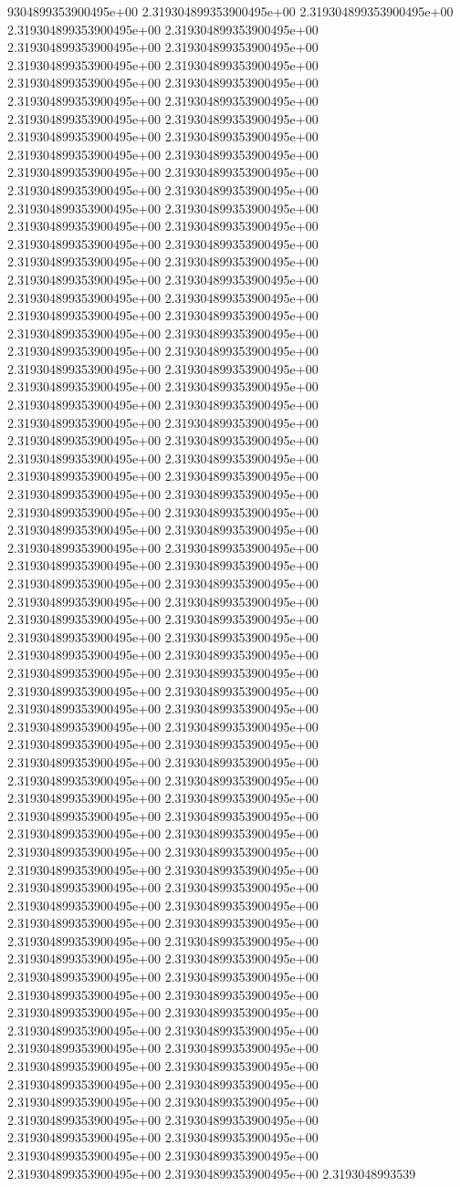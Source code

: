 9304899353900495e+00	2.319304899353900495e+00	2.319304899353900495e+00	2.319304899353900495e+00	2.319304899353900495e+00	2.319304899353900495e+00	2.319304899353900495e+00	2.319304899353900495e+00	2.319304899353900495e+00	2.319304899353900495e+00	2.319304899353900495e+00	2.319304899353900495e+00	2.319304899353900495e+00	2.319304899353900495e+00	2.319304899353900495e+00	2.319304899353900495e+00	2.319304899353900495e+00	2.319304899353900495e+00	2.319304899353900495e+00	2.319304899353900495e+00	2.319304899353900495e+00	2.319304899353900495e+00	2.319304899353900495e+00	2.319304899353900495e+00	2.319304899353900495e+00	2.319304899353900495e+00	2.319304899353900495e+00	2.319304899353900495e+00	2.319304899353900495e+00	2.319304899353900495e+00	2.319304899353900495e+00	2.319304899353900495e+00	2.319304899353900495e+00	2.319304899353900495e+00	2.319304899353900495e+00	2.319304899353900495e+00	2.319304899353900495e+00	2.319304899353900495e+00	2.319304899353900495e+00	2.319304899353900495e+00	2.319304899353900495e+00	2.319304899353900495e+00	2.319304899353900495e+00	2.319304899353900495e+00	2.319304899353900495e+00	2.319304899353900495e+00	2.319304899353900495e+00	2.319304899353900495e+00	2.319304899353900495e+00	2.319304899353900495e+00	2.319304899353900495e+00	2.319304899353900495e+00	2.319304899353900495e+00	2.319304899353900495e+00	2.319304899353900495e+00	2.319304899353900495e+00	2.319304899353900495e+00	2.319304899353900495e+00	2.319304899353900495e+00	2.319304899353900495e+00	2.319304899353900495e+00	2.319304899353900495e+00	2.319304899353900495e+00	2.319304899353900495e+00	2.319304899353900495e+00	2.319304899353900495e+00	2.319304899353900495e+00	2.319304899353900495e+00	2.319304899353900495e+00	2.319304899353900495e+00	2.319304899353900495e+00	2.319304899353900495e+00	2.319304899353900495e+00	2.319304899353900495e+00	2.319304899353900495e+00	2.319304899353900495e+00	2.319304899353900495e+00	2.319304899353900495e+00	2.319304899353900495e+00	2.319304899353900495e+00	2.319304899353900495e+00	2.319304899353900495e+00	2.319304899353900495e+00	2.319304899353900495e+00	2.319304899353900495e+00	2.319304899353900495e+00	2.319304899353900495e+00	2.319304899353900495e+00	2.319304899353900495e+00	2.319304899353900495e+00	2.319304899353900495e+00	2.319304899353900495e+00	2.319304899353900495e+00	2.319304899353900495e+00	2.319304899353900495e+00	2.319304899353900495e+00	2.319304899353900495e+00	2.319304899353900495e+00	2.319304899353900495e+00	2.319304899353900495e+00	2.319304899353900495e+00	2.319304899353900495e+00	2.319304899353900495e+00	2.319304899353900495e+00	2.319304899353900495e+00	2.319304899353900495e+00	2.319304899353900495e+00	2.319304899353900495e+00	2.319304899353900495e+00	2.319304899353900495e+00	2.319304899353900495e+00	2.319304899353900495e+00	2.319304899353900495e+00	2.319304899353900495e+00	2.319304899353900495e+00	2.319304899353900495e+00	2.319304899353900495e+00	2.319304899353900495e+00	2.319304899353900495e+00	2.319304899353900495e+00	2.319304899353900495e+00	2.319304899353900495e+00	2.319304899353900495e+00	2.319304899353900495e+00	2.319304899353900495e+00	2.319304899353900495e+00	2.319304899353900495e+00	2.319304899353900495e+00	2.319304899353900495e+00	2.319304899353900495e+00	2.319304899353900495e+00	2.319304899353900495e+00	2.319304899353900495e+00	2.3193048993539